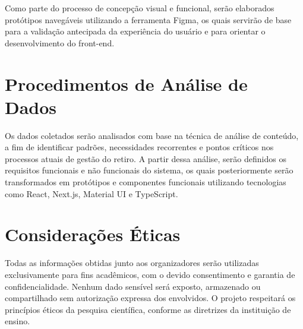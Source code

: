 Como parte do processo de concepção visual e funcional, serão elaborados protótipos navegáveis utilizando a ferramenta Figma, os quais servirão de base para a validação antecipada da experiência do usuário e para orientar o desenvolvimento do front-end.

\section{Procedimentos de Análise de Dados}

Os dados coletados serão analisados com base na técnica de análise de conteúdo, a fim de identificar padrões, necessidades recorrentes e pontos críticos nos processos atuais de gestão do retiro. A partir dessa análise, serão definidos os requisitos funcionais e não funcionais do sistema, os quais posteriormente serão transformados em protótipos e componentes funcionais utilizando tecnologias como React, Next.js, Material UI e TypeScript.

\section{Considerações Éticas}

Todas as informações obtidas junto aos organizadores serão utilizadas exclusivamente para fins acadêmicos, com o devido consentimento e garantia de confidencialidade. Nenhum dado sensível será exposto, armazenado ou compartilhado sem autorização expressa dos envolvidos. O projeto respeitará os princípios éticos da pesquisa científica, conforme as diretrizes da instituição de ensino.